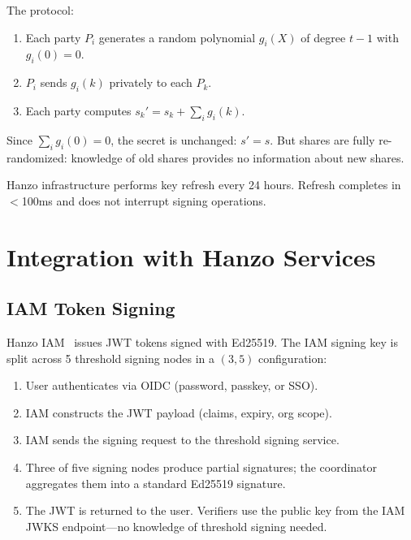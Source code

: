 \documentclass[11pt]{article}
\begin{document}
The protocol:
\begin{enumerate}[leftmargin=1.4em]
    \item Each party $P_i$ generates a random polynomial $g_i(X)$ of degree
    $t-1$ with $g_i(0) = 0$.
    \item $P_i$ sends $g_i(k)$ privately to each $P_k$.
    \item Each party computes $s_k' = s_k + \sum_i g_i(k)$.
\end{enumerate}

Since $\sum_i g_i(0) = 0$, the secret is unchanged: $s' = s$. But shares are
fully re-randomized: knowledge of old shares provides no information about new
shares.

Hanzo infrastructure performs key refresh every 24 hours. Refresh completes in
$<$100ms and does not interrupt signing operations.

\section{Integration with Hanzo Services}
\label{sec:services}

\subsection{IAM Token Signing}

Hanzo IAM~\cite{hanzoiam} issues JWT tokens signed with Ed25519. The IAM
signing key is split across 5 threshold signing nodes in a $(3, 5)$
configuration:

\begin{enumerate}[leftmargin=1.4em]
    \item User authenticates via OIDC (password, passkey, or SSO).
    \item IAM constructs the JWT payload (claims, expiry, org scope).
    \item IAM sends the signing request to the threshold signing service.
    \item Three of five signing nodes produce partial signatures; the
    coordinator aggregates them into a standard Ed25519 signature.
    \item The JWT is returned to the user. Verifiers use the public key
    from the IAM JWKS endpoint---no knowledge of threshold signing needed.
\end{enumerate}
\end{document}
